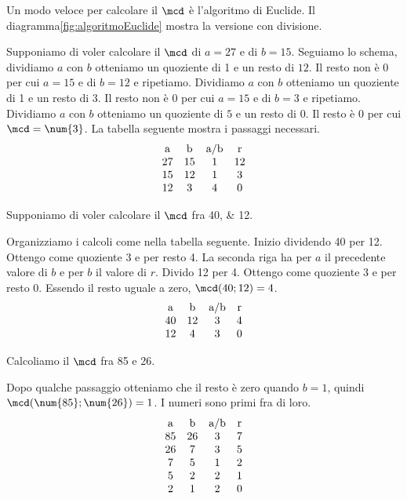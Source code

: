    Un modo veloce per calcolare il $\mcd$ è l'algoritmo di Euclide. Il diagramma\nobs\vref{fig:algoritmoEuclide} mostra la versione con divisione. 
   
   Supponiamo di voler calcolare il $\mcd$ di $a=\num{27}$ e di $b=\num{15}$. Seguiamo lo schema, dividiamo $a$ con $b$ otteniamo un quoziente di 1 e un resto di $12$. Il resto non è $0$ per cui $a=\num{15}$ e di $b=\num{12}$ e ripetiamo. Dividiamo $a$ con $b$ otteniamo un quoziente di 1 e un resto di $3$. Il resto non è $0$ per cui $a=\num{15}$ e di $b=\num{3}$ e ripetiamo.  Dividiamo $a$ con $b$ otteniamo un quoziente di $5$ e un resto di $0$. Il resto è $0$ per cui $\mcd=\num{3}$. La tabella seguente mostra i passaggi necessari.
 \[
\begin{array}{cccc}
$a$&$b$&$a/b$&$r$\\
	27&15&1&12\\
    15&12&1&3\\
    12&3&4&0
    \end{array} 
    \]
 \begin{esempiot}{}{}
    Supponiamo di voler calcolare il $\mcd$ fra \numlist{40;12}. 
 \end{esempiot}   
    Organizziamo  i calcoli come nella tabella seguente. Inizio dividendo \num{40} per \num{12}. Ottengo come quoziente  \num{3} e per resto  \num{4}. La seconda riga ha per $a$ il precedente valore di $b$ e per $b$ il valore di $r$. Divido  \num{12} per \num{4}. Ottengo come quoziente  \num{3} e per resto  \num{0}. Essendo il resto uguale a zero, $\mcd(40;12)=4$.
       \[
      \begin{array}{cccc}
      $a$&$b$&$a/b$&$r$\\
      		40&12&3&4\\
      	   	12&4&3&0
          \end{array} 
          \]
       \begin{esempiot}{}{}
    Calcoliamo il $\mcd$ fra \num{85} e \num{26}. 
       \end{esempiot}
    Dopo qualche passaggio otteniamo che il resto è zero quando $b=1$, quindi $\mcd(\num{85};\num{26})=1$. I numeri sono primi fra di loro. 
   	   \[
   	   \begin{array}{cccc}
   	   $a$&$b$&$a/b$&$r$\\
   	   	85&26&3&7\\
   	   	26&7&3&5\\
   	   	7&5&1&2\\
   	   	5&2&2&1\\
   	   	2&1&2&0
   	    \end{array} 
   	     \]
